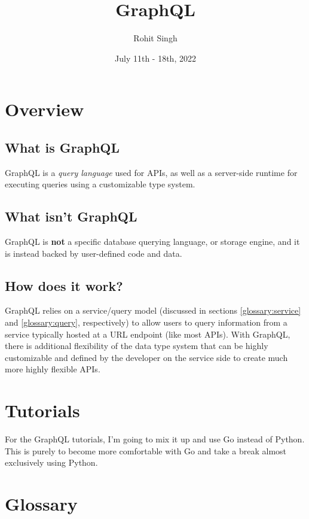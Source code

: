 \documentclass{article}
\title{GraphQL}
\author{Rohit Singh}
\date{July 11th - 18th, 2022}
\begin{document}
\maketitle

\tableofcontents

\section{Overview}

\subsection{What is GraphQL}

GraphQL is a \textit{query language} used for APIs, as well as a server-side runtime for executing queries using a customizable type system.

\subsection{What isn't GraphQL}

GraphQL is \textbf{not} a specific database querying language, or storage engine, and it is instead backed by user-defined code and data.

\subsection{How does it work?}

GraphQL relies on a service/query model (discussed in sections \ref{glossary:service} and \ref{glossary:query}, respectively) to allow users to query information from a service typically hosted at a URL endpoint (like most APIs). With GraphQL, there is additional flexibility of the data type system that can be highly customizable and defined by the developer on the service side to create much more highly flexible APIs.

\section{Tutorials}

For the GraphQL tutorials, I'm going to mix it up and use Go instead of Python. This is purely to become more comfortable with Go and take a break almost exclusively using Python.

\section{Glossary}
\end{document}
